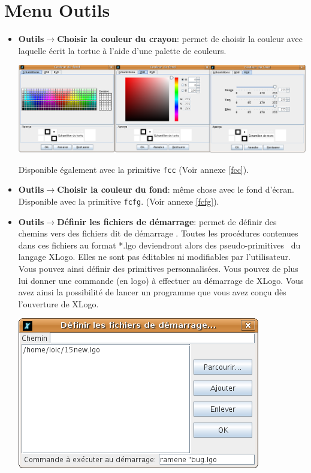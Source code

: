\section{Menu \og Outils \fg}
\begin{itemize}
\item \textbf{Outils$\to$Choisir la couleur du crayon}: permet de choisir la couleur
avec laquelle écrit la tortue à l'aide d'une palette de couleurs.\\
\begin{center}
 \includegraphics[scale=0.3]{images/CaptureCouleur.png}
\end{center}
\vspace{0.25cm}
Disponible également avec la primitive \texttt{fcc} (Voir annexe \ref{fcc}).\\
\item \textbf{Outils$\to$Choisir la couleur du fond}: même chose avec le fond d'écran.
Disponible avec la primitive \texttt{fcfg}. (Voir annexe \ref{fcfg}).\\
\item \textbf{Outils$\to$Définir les fichiers de démarrage}: permet de définir des chemins vers des fichiers dit \og de démarrage \fg. Toutes les procédures contenues dans ces fichiers au format *.lgo deviendront alors des \og pseudo-primitives \fg \ du langage XLogo. Elles ne sont pas éditables ni modifiables par l'utilisateur. Vous pouvez ainsi définir des primitives personnalisées. Vous pouvez de plus lui donner une commande (en logo) à effectuer au démarrage de XLogo. Vous avez ainsi la possibilité de lancer un programme que vous avez conçu dès l'ouverture de XLogo.\\
\begin{center}
 \includegraphics[scale=0.4]{images/CaptureDemarrage.png}

\end{center}
\end{itemize}
